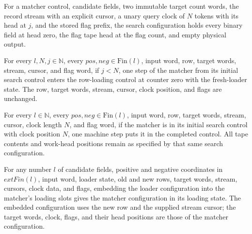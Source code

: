\begin{definition}
\label{Complexity.clMatchCfg}
\leanok
{}
For a matcher control, candidate fields, two immutable target count words, the record stream with an explicit cursor, a unary query clock of $N$ tokens with its head at $j$, and the stored flag prefix, the search configuration holds every binary field at head zero, the flag tape head at the flag count, and empty physical output.
\end{definition}

\begin{lemma}
\label{Complexity.clMatch_tick}
\leanok
{}
For every $l,N,j\in\mathbb{N}$, every $pos,neg\in\text{Fin}(l)$, input word, row, target
words, stream, cursor, and flag word, if $j<N$, one step of the matcher from its initial
search control enters the row-loading control at counter zero with the fresh-loader
state. The row, target words, stream, cursor, clock position, and flags are unchanged.
\end{lemma}

\begin{lemma}
\label{Complexity.clMatch_stop}
\leanok
{}
For every $l\in\mathbb{N}$, every $pos,neg\in\text{Fin}(l)$, input word, row, target
words, stream, cursor, clock length $N$, and flag word, if the matcher is in its initial
search control with clock position $N$, one machine step puts it in the completed
control. All tape contents and work-head positions remain as specified by that same
search configuration.
\end{lemma}

\begin{lemma}
\label{Complexity.clMatch_load_frame}
\leanok
{}
For any number $l$ of candidate fields, positive and negative coordinates in
$	ext{Fin}(l)$, input word, loader state, old and new rows, target words, stream,
cursors, clock data, and flags, embedding the loader configuration into the matcher’s
loading slots gives the matcher configuration in its loading state. The embedded
configuration uses the new row and the supplied stream cursor; the target words, clock,
flags, and their head positions are those of the matcher configuration.
\end{lemma}

